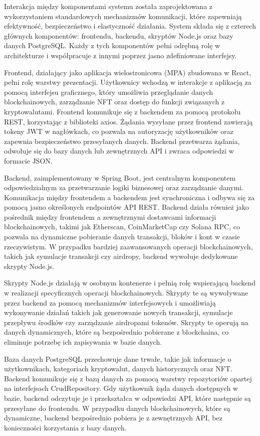 Interakcja między komponentami systemu została zaprojektowana z wykorzystaniem standardowych mechanizmów komunikacji, które zapewniają efektywność, bezpieczeństwo i elastyczność działania. System składa się z czterech głównych komponentów: frontendu, backendu, skryptów Node.js oraz bazy danych PostgreSQL. Każdy z tych komponentów pełni odrębną rolę w architekturze i współpracuje z innymi poprzez jasno zdefiniowane interfejsy.

Frontend, działający jako aplikacja wielostronicowa (MPA) zbudowana w React, pełni rolę warstwy prezentacji. Użytkownicy wchodzą w interakcje z aplikacją za pomocą interfejsu graficznego, który umożliwia przeglądanie danych blockchainowych, zarządzanie NFT oraz dostęp do funkcji związanych z kryptowalutami. Frontend komunikuje się z backendem za pomocą protokołu REST, korzystając z biblioteki axios. Żądania wysyłane przez frontend zawierają tokeny JWT w nagłówkach, co pozwala na autoryzację użytkowników oraz zapewnia bezpieczeństwo przesyłanych danych. Backend przetwarza żądania, odwołuje się do bazy danych lub zewnętrznych API i zwraca odpowiedzi w formacie JSON.

Backend, zaimplementowany w Spring Boot, jest centralnym komponentem odpowiedzialnym za przetwarzanie logiki biznesowej oraz zarządzanie danymi. Komunikacja między frontendem a backendem jest synchroniczna i odbywa się za pomocą jasno określonych endpointów API REST. Backend działa również jako pośrednik między frontendem a zewnętrznymi dostawcami informacji blockchainowych, takimi jak Etherscan, CoinMarketCap czy Solana RPC, co pozwala na dynamiczne pobieranie danych transakcji, bloków i kont w czasie rzeczywistym. W przypadku bardziej zaawansowanych operacji blockchainowych, takich jak symulacje transakcji czy airdropy, backend wywołuje dedykowane skrypty Node.js.

Skrypty Node.js działają w osobnym kontenerze i pełnią rolę wspierającą backend w realizacji specyficznych operacji blockchainowych. Skrypty te są wywoływane przez backend za pomocą mechanizmów interfejsowych i umożliwiają wykonywanie działań takich jak generowanie nowych transakcji, symulacje przepływu środków czy zarządzanie airdropami tokenów. Skrypty te operują na danych dynamicznych, które są bezpośrednio pobierane z blockchaina, co eliminuje potrzebę ich zapisywania w bazie danych.

Baza danych PostgreSQL przechowuje dane trwałe, takie jak informacje o użytkownikach, kategoriach kryptowalut, danych historycznych oraz NFT. Backend komunikuje się z bazą danych za pomocą warstwy repozytoriów opartej na interfejsach CrudRepository. Gdy użytkownik żąda danych dostępnych w bazie, backend odczytuje je i przekształca w odpowiedzi API, które następnie są przesyłane do frontendu. W przypadku danych blockchainowych, które są dynamiczne, backend bezpośrednio pobiera je z zewnętrznych API, bez konieczności korzystania z bazy danych.

